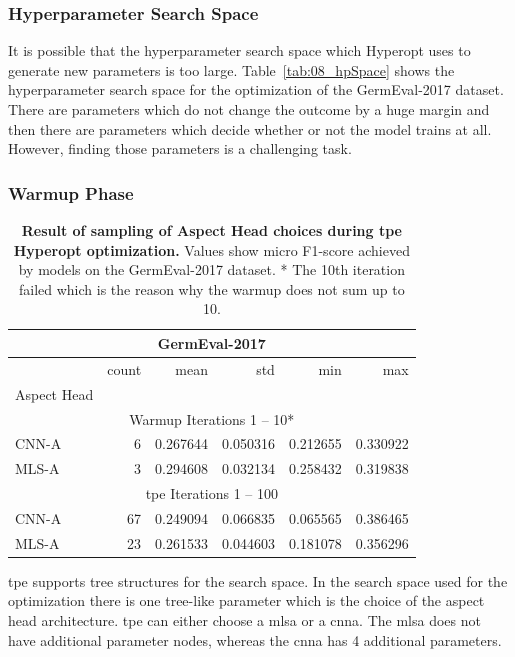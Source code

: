 \subsubsection*{Hyperparameter Search Space}

It is possible that the hyperparameter search space which Hyperopt uses to generate new parameters is too large. Table~\ref{tab:08_hpSpace} shows the hyperparameter search space for the optimization of the GermEval-2017 dataset. There are parameters which do not change the outcome by a huge margin and then there are parameters which decide whether or not the model trains at all. However, finding those parameters is a challenging task.

\subsubsection*{Warmup Phase}
\label{sec:06_hp_warmup}
\begin{table}[]
	\centering
	\begin{tabular}{lrrrrr}
	\multicolumn{6}{c}{GermEval-2017} \\

	\toprule
	{} &  count &      mean &       std &       min &       max \\
	Aspect Head &        &           &           &           &           \\
	\midrule
	\multicolumn{6}{c}{Warmup Iterations 1 -- 10*} \\
	CNN-A    &    6 &  0.267644 &  0.050316 &  0.212655 &  0.330922 \\
	MLS-A    &    3 &  0.294608 &  0.032134 &  0.258432 &  0.319838 \\
	\midrule
	\multicolumn{6}{c}{\gls{tpe} Iterations 1 -- 100} \\
	CNN-A    &   67 &  0.249094 &  0.066835 &  0.065565 &  0.386465 \\
	MLS-A    &   23 &  0.261533 &  0.044603 &  0.181078 &  0.356296 \\
	\bottomrule
	\end{tabular}
	\caption{\textbf{Result of sampling of Aspect Head choices during \gls{tpe} Hyperopt optimization.} Values show micro F1-score achieved by models on the GermEval-2017 dataset. * The 10th iteration failed which is the reason why the warmup does not sum up to 10.}
	\label{tab:08_hpAspectHeadsSpace}	
\end{table}

\gls{tpe} supports tree structures for the search space. In the search space used for the optimization there is one tree-like parameter which is the choice of the aspect head architecture. \gls{tpe} can either choose a \gls{mlsa} or a \gls{cnna}. The \gls{mlsa} does not have additional parameter nodes, whereas the \gls{cnna} has 4 additional parameters.
\medskip

